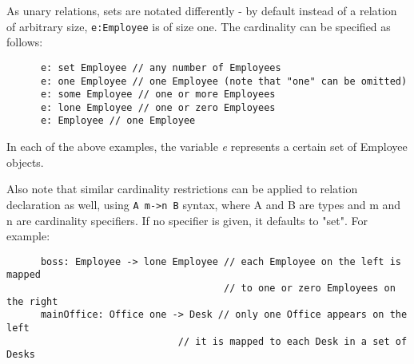 \documentclass[10pt]{article}
\begin{document}
    As unary relations, sets are notated differently - by default instead of a relation of arbitrary size, \lstinline|e:Employee| is of size one. The cardinality can be specified as follows:
    \begin{verbatim}
      e: set Employee // any number of Employees
      e: one Employee // one Employee (note that "one" can be omitted)
      e: some Employee // one or more Employees
      e: lone Employee // one or zero Employees
      e: Employee // one Employee
    \end{verbatim}
    In each of the above examples, the variable \textit{e} represents a certain set of Employee objects.\par
    Also note that similar cardinality restrictions can be applied to relation declaration as well, using \lstinline|A m->n B| syntax, where A and B are types and m and n are cardinality specifiers. If no specifier is given, it defaults to "set". For example:
    \begin{verbatim}
      boss: Employee -> lone Employee // each Employee on the left is mapped
                                      // to one or zero Employees on the right
      mainOffice: Office one -> Desk // only one Office appears on the left
                              // it is mapped to each Desk in a set of Desks
    \end{verbatim}
\end{document}
